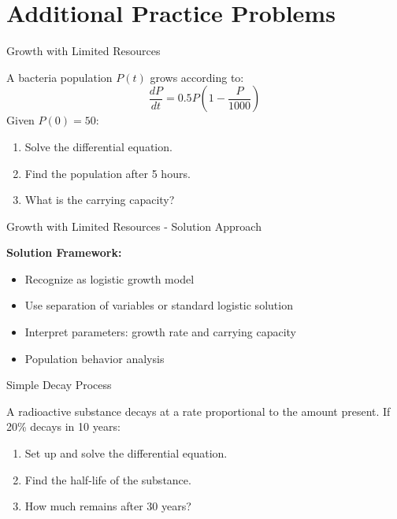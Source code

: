 \documentclass[10pt,aspectratio=169]{beamer}
\newcommand{\formula}[1]{\textit{#1}}
\begin{document}
\section{Additional Practice Problems}
\begin{frame}{Growth with Limited Resources}
    \begin{problembox}
        A bacteria population $P(t)$ grows according to:
        \formula{\[ \frac{dP}{dt} = 0.5P\left(1-\frac{P}{1000}\right) \]}
        Given $P(0) = 50$:
        \begin{enumerate}
            \item Solve the differential equation.
            \item Find the population after 5 hours.
            \item What is the carrying capacity?
        \end{enumerate}
    \end{problembox}
\end{frame}

\begin{frame}{Growth with Limited Resources - Solution Approach}
    \begin{solutionbox}
        \textbf{Solution Framework:}
        \begin{itemize}
            \item Recognize as logistic growth model
            \item Use separation of variables or standard logistic solution
            \item Interpret parameters: growth rate and carrying capacity
            \item Population behavior analysis
        \end{itemize}
    \end{solutionbox}
\end{frame}

\begin{frame}{Simple Decay Process}
    \begin{problembox}
        A radioactive substance decays at a rate proportional to the amount present. If 20\% decays in 10 years:
        \begin{enumerate}
            \item Set up and solve the differential equation.
            \item Find the half-life of the substance.
            \item How much remains after 30 years?
        \end{enumerate}
    \end{problembox}
\end{frame}
\end{document}

